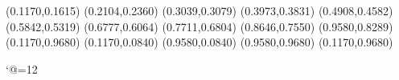 \PST@Diamond(0.1170,0.1615)
\PST@Diamond(0.2104,0.2360)
\PST@Diamond(0.3039,0.3079)
\PST@Diamond(0.3973,0.3831)
\PST@Diamond(0.4908,0.4582)
\PST@Diamond(0.5842,0.5319)
\PST@Diamond(0.6777,0.6064)
\PST@Diamond(0.7711,0.6804)
\PST@Diamond(0.8646,0.7550)
\PST@Diamond(0.9580,0.8289)
\PST@Border(0.1170,0.9680)
(0.1170,0.0840)
(0.9580,0.0840)
(0.9580,0.9680)
(0.1170,0.9680)

\catcode`@=12
\fi
\endpspicture
